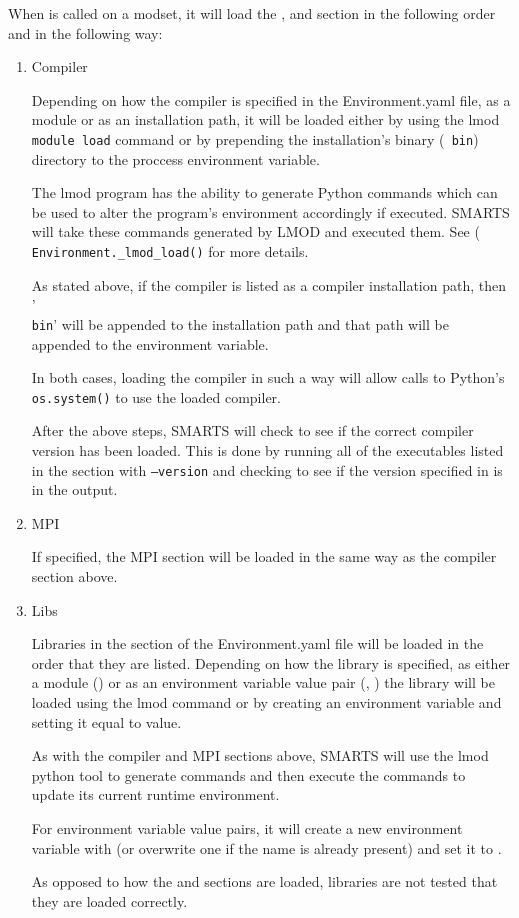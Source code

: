 When \loadModset is called on a modset, it will load the \compiler, \mpi and
\libs section in the following order and in the following way:

\begin{enumerate}

\item Compiler 

Depending on how the compiler is specified in the Environment.yaml file, as a
module or as an installation path, it will be loaded either by using the lmod
{\tt module load} command or by prepending the installation's binary ({\tt
bin}) directory to the proccess \pathenv environment variable. 

The lmod program has the ability to generate Python commands which can be used
to alter the program's environment accordingly if executed. SMARTS will take
these commands generated by LMOD and executed them. See ({\tt
Environment.\_lmod\_load()} for more details.

As stated above, if the compiler is listed as a compiler installation path,
then '{\tt \\bin}' will be appended to the installation path and that path will
be appended to the \pathenv environment variable.

In both cases, loading the compiler in such a way will allow calls to Python's
{\tt os.system()} to use the loaded compiler.

After the above steps, SMARTS will check to see if the correct compiler version
has been loaded. This is done by running all of the executables listed in the
\executables section with {\tt --version} and checking to see if the version
specified in \version is in the output.


\item MPI

If specified, the MPI section will be loaded in the same way as the compiler
section above.

\item Libs 

Libraries in the \libs section of the Environment.yaml file will be loaded in
the order that they are listed. Depending on how the library is specified, as
either a module (\module) or as an environment variable value pair (\name,
\value) the library will be loaded using the lmod command or by creating an
environment variable and setting it equal to value.

As with the compiler and MPI sections above, SMARTS will use the lmod python
tool to generate commands and then execute the commands to update its current
runtime environment. 

For environment variable value pairs, it will create a new environment variable
with \name (or overwrite one if the name is already present) and set it to
\value.

As opposed to how the \compiler and \mpi sections are loaded, libraries are not
tested that they are loaded correctly.

\end{enumerate}

